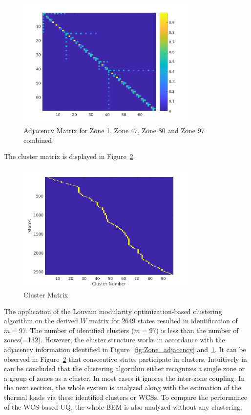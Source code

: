 \begin{figure}[H]
\centering
\includegraphics[width=0.8\textwidth]{jbs_figures/adj_comb}
\caption{Adjacency Matrix for Zone 1, Zone 47, Zone 80 and Zone 97 combined }
\label{adj_new}
\end{figure}

The cluster matrix is displayed in Figure~\ref{cluster_matrix}. 

\begin{figure}[H]
\centering
\includegraphics[width=0.8\textwidth]{jbs_figures/cluster_matrix}
\caption{Cluster Matrix}
\label{cluster_matrix}
\end{figure}

The application of the Louvain modularity optimization-based clustering algorithm on the derived $W$ matrix for 2649 states resulted in identification of $m=97$. The number of identified clusters ($m=97$) is less than the number of zones(=132). However, the cluster structure works in accordance with the adjacency information identified in Figure~\ref{fig:Zone_adjacency} and~\ref{adj_new}. It can be observed in Figure~\ref{cluster_matrix} that consecutive states participate in clusters. Intuitively in can be concluded that the clustering algorithm either recognizes a single zone or a group of zones as a cluster. In most cases it ignores the inter-zone coupling. In the next section, the whole system is analyzed along with the estimation of the thermal loads via these identified clusters or WCSs. To compare the performance of the WCS-based UQ, the whole BEM is also analyzed without any clustering.

